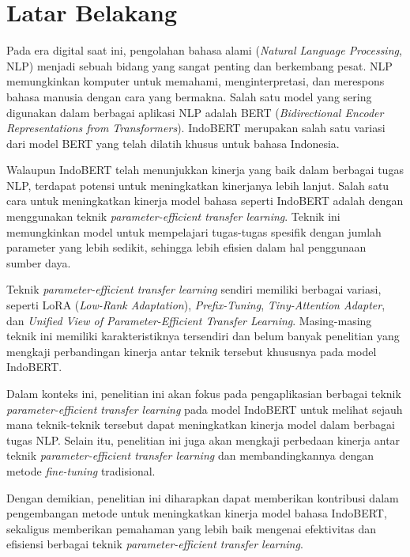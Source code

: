 \section{Latar Belakang}

Pada era digital saat ini, pengolahan bahasa alami (\textit{Natural Language Processing}, NLP) menjadi sebuah bidang yang sangat penting dan berkembang pesat. NLP memungkinkan komputer untuk memahami, menginterpretasi, dan merespons bahasa manusia dengan cara yang bermakna. Salah satu model yang sering digunakan dalam berbagai aplikasi NLP adalah BERT (\textit{Bidirectional Encoder Representations from Transformers}). IndoBERT merupakan salah satu variasi dari model BERT yang telah dilatih khusus untuk bahasa Indonesia.

Walaupun IndoBERT telah menunjukkan kinerja yang baik dalam berbagai tugas NLP, terdapat potensi untuk meningkatkan kinerjanya lebih lanjut. Salah satu cara untuk meningkatkan kinerja model bahasa seperti IndoBERT adalah dengan menggunakan teknik \textit{parameter-efficient transfer learning}. Teknik ini memungkinkan model untuk mempelajari tugas-tugas spesifik dengan jumlah parameter yang lebih sedikit, sehingga lebih efisien dalam hal penggunaan sumber daya.

Teknik \textit{parameter-efficient transfer learning} sendiri memiliki berbagai variasi, seperti LoRA (\textit{Low-Rank Adaptation}), \textit{Prefix-Tuning}, \textit{Tiny-Attention Adapter}, dan \textit{Unified View of Parameter-Efficient Transfer Learning}. Masing-masing teknik ini memiliki karakteristiknya tersendiri dan belum banyak penelitian yang mengkaji perbandingan kinerja antar teknik tersebut khususnya pada model IndoBERT.

Dalam konteks ini, penelitian ini akan fokus pada pengaplikasian berbagai teknik \textit{parameter-efficient transfer learning} pada model IndoBERT untuk melihat sejauh mana teknik-teknik tersebut dapat meningkatkan kinerja model dalam berbagai tugas NLP. Selain itu, penelitian ini juga akan mengkaji perbedaan kinerja antar teknik \textit{parameter-efficient transfer learning} dan membandingkannya dengan metode \textit{fine-tuning} tradisional.

Dengan demikian, penelitian ini diharapkan dapat memberikan kontribusi dalam pengembangan metode untuk meningkatkan kinerja model bahasa IndoBERT, sekaligus memberikan pemahaman yang lebih baik mengenai efektivitas dan efisiensi berbagai teknik \textit{parameter-efficient transfer learning}.